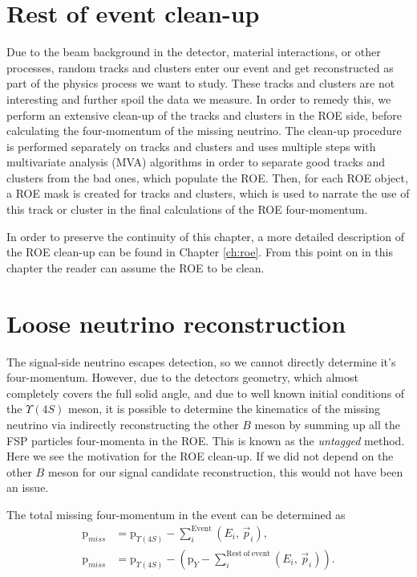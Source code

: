 \documentclass[oneside,a4paper,openany,12pt]{scrbook}
\begin{document}
\section{Rest of event clean-up}
\label{sc:shortroe}

Due to the beam background in the detector, material interactions, or other processes, random tracks and clusters enter our event and get reconstructed as part of the physics process we want to study. These tracks and clusters are not interesting and further spoil the data we measure. In order to remedy this, we perform an extensive clean-up of the tracks and clusters in the ROE side, before calculating the four-momentum of the missing neutrino. The clean-up procedure is performed separately on tracks and clusters and uses multiple steps with multivariate analysis (MVA) algorithms in order to separate good tracks and clusters from the bad ones, which populate the ROE. Then, for each ROE object, a ROE mask is created for tracks and clusters, which is used to narrate the use of this track or cluster in the final calculations of the ROE four-momentum.

In order to preserve the continuity of this chapter, a more detailed description of the ROE clean-up can be found in Chapter \ref{ch:roe}. From this point on in this chapter the reader can assume the ROE to be clean.

\section{Loose neutrino reconstruction}

The signal-side neutrino escapes detection, so we cannot directly determine it's four-momentum. However, due to the detectors geometry, which almost completely covers the full solid angle, and due to well known initial conditions of the $\Upsilon(4S)$ meson, it is possible to determine the kinematics of the missing neutrino via indirectly reconstructing the other $B$ meson by summing up all the FSP particles four-momenta in the ROE. This is known as the \textit{untagged} method. Here we see the motivation for the ROE clean-up. If we did not depend on the other $B$ meson for our signal candidate reconstruction, this would not have been an issue.

The total missing four-momentum in the event can be determined as
\begin{align}
\mathrm{p}_{miss} &= \mathrm{p}_{\Upsilon(4S)} - \sum_i^{\mathrm{Event}}\left(E_i,\,\vec{p}_i \right),\\
\mathrm{p}_{miss} &= \mathrm{p}_{\Upsilon(4S)} - \left(\mathrm{p}_{Y} -\sum_i^{\mathrm{Rest~of~event}}\left(E_i,\,\vec{p}_i \right)\right).
\end{align}
\end{document}
